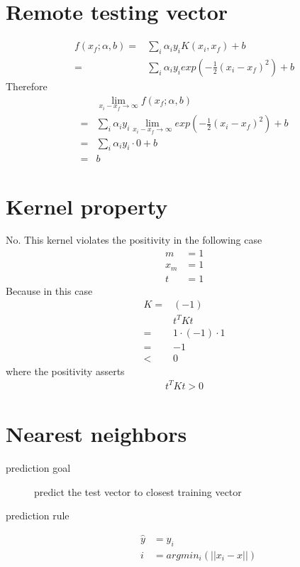 \documentclass[12pt]{article}
\begin{document}
\begin{multicols}{2}
  \section{Remote testing vector}
  \begin{align*}
    f(x_f; \alpha,b)
    =& \sum_{i} \alpha_i y_i K(x_i, x_f) + b \\
    =& \sum_{i} \alpha_i y_i exp(-\frac{1}{2} (x_i - x_f)^2) + b
  \end{align*}
  Therefore
  \begin{align*}
    & \lim_{x_i-x_f \to \infty} f(x_f; \alpha,b) \\
    =& \sum_{i} \alpha_i y_i \lim_{x_i-x_f \to \infty} exp(-\frac{1}{2} (x_i - x_f)^2) + b \\
    =& \sum_{i} \alpha_i y_i \cdot 0 + b \\
    =& b
  \end{align*}
  \section{Kernel property}
  No. This kernel violates the positivity in the following case
  \begin{align*}
    m &= 1 \\
    x_m &= 1 \\
    t &= 1
  \end{align*}
  Because in this case
  \begin{align*}
    K =& (-1) \\
    & t^T K t \\
    =& 1 \cdot (-1) \cdot 1 \\
    =& -1 \\
    <& 0
  \end{align*}
  where the positivity asserts
  \begin{align*}
    t^T K t > 0
  \end{align*}

  \section{Nearest neighbors}
  \begin{description}
    \item[prediction goal] predict the test vector to closest training vector
    \item[prediction rule]
      \begin{align*}
        \hat{y} &= y_i\\
        i &= argmin_i (||x_i - x||)
      \end{align*}
  \end{description}


\end{multicols}
\end{document}
